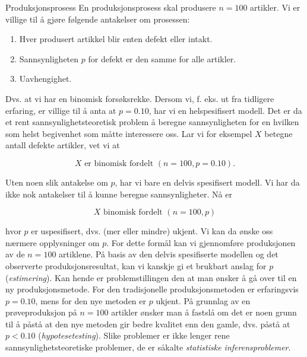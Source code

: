 \begin{eksempel}{Produksjonsprosess}
En produksjonsprosess skal produsere $n=100$ artikler. Vi er
villige til å gjøre følgende antakelser om prosessen:
\begin{enumerate}
 \item  Hver produsert artikkel blir enten defekt eller intakt.
 \item  Sannsynligheten $p$ for defekt er den samme for alle
          artikler.
\item   Uavhengighet.
\end{enumerate}
Dvs. at vi har en binomisk forsøksrekke. Dersom vi, f. eks. ut
fra tidligere erfaring, er villige til å anta at $p=0.10$, har vi
en helspesifisert modell. Det er da et rent
sannsynlighetsteoretisk problem å beregne sannsynligheten for en
hvilken som helst begivenhet som måtte interessere oss. Lar vi
for eksempel $X$ betegne antall defekte artikler, vet vi at

\[      X \mbox{\ \  er binomisk fordelt $(n=100, p=0.10)$.} \]

\noindent Uten noen slik antakelse om $p$, har vi bare en delvis
spesifisert modell. Vi har da ikke nok antakelser til å kunne
beregne sannsynligheter. Nå er

\[            X \mbox{\ \  binomisk fordelt $(n=100, p)$} \]

\noindent hvor $p$ er uspesifisert, dvs. (mer eller mindre) ukjent. Vi kan
da ønske oss nærmere opplysninger om $p$. For dette formål kan vi
gjennomføre produksjonen av de $n=100$ artiklene. På basis av den
delvis spesifiserte modellen og det observerte
produksjonsresultat, kan vi kanskje gi et brukbart anslag for $p$
({\em estimering}). Kan hende er problemstillingen den at man
ønsker å gå over til en ny produksjonsmetode. For den
tradisjonelle produksjonsmetoden er erfaringsvis $p=0.10$, mens
for den nye metoden er $p$ ukjent. På grunnlag av en
prøveproduksjon på $n=100$ artikler ønsker man å fastslå om
det er noen grunn til å påstå at den nye metoden gir bedre kvalitet
enn den gamle, dvs. påstå at $p<0.10$ ({\em hypotesetesting}).
Slike problemer er ikke lenger rene sannsynlighetsteoretiske
problemer, de er såkalte {\em statistiske inferensproblemer}.
\end{eksempel}

